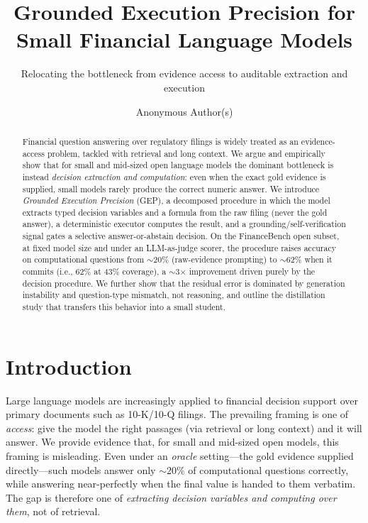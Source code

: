 \documentclass[sigconf,nonacm]{acmart}
\begin{document}
\title{Grounded Execution Precision for Small Financial Language Models}
\subtitle{Relocating the bottleneck from evidence access to auditable extraction and execution}

\author{Anonymous Author(s)}

\begin{abstract}
Financial question answering over regulatory filings is widely treated as an evidence-access
problem, tackled with retrieval and long context. We argue and empirically show that for small
and mid-sized open language models the dominant bottleneck is instead \emph{decision extraction
and computation}: even when the exact gold evidence is supplied, small models rarely produce the
correct numeric answer. We introduce \emph{Grounded Execution Precision} (\textsc{GEP}), a
decomposed procedure in which the
model extracts typed decision variables and a formula from the raw filing (never the gold
answer), a deterministic executor computes the result, and a grounding/self-verification signal
gates a selective answer-or-abstain decision. On the FinanceBench open subset, at fixed model
size and under an LLM-as-judge scorer, the procedure raises accuracy on computational questions
from $\sim$20\% (raw-evidence prompting) to $\sim$62\% when it commits (i.e., 62\% at 43\%
coverage), a $\sim$3$\times$ improvement driven purely by the decision procedure. We further show
that the residual error is dominated by generation instability and question-type mismatch, not
reasoning, and outline the distillation study that transfers this behavior into a small student.
\end{abstract}


\maketitle

\section{Introduction}
Large language models are increasingly applied to financial decision support over primary
documents such as 10-K/10-Q filings. The prevailing framing is one of \emph{access}: give the
model the right passages (via retrieval or long context) and it will answer. We provide evidence
that, for small and mid-sized open models, this framing is misleading. Even under an
\emph{oracle} setting---the gold evidence supplied directly---such models answer only $\sim$20\%
of computational questions correctly, while answering near-perfectly when the final value is
handed to them verbatim. The gap is therefore one of \emph{extracting decision variables and
computing over them}, not of retrieval.
\end{document}
